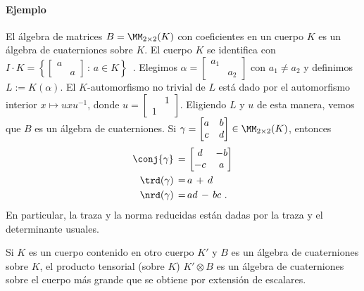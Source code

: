 \paragraph{Ejemplo}
El \'{a}lgebra de matrices $B=\MM_{2\times 2}(K)$ con coeficientes en un
cuerpo $K$ es un \'{a}lgebra de cuaterniones sobre $K$. El cuerpo $K$ se
identifica con
\begin{math}
 I\cdot K=\left\lbrace \begin{bmatrix} a & \\ & a \end{bmatrix}\,:\,
 a\in K\right\rbrace
\end{math}~.
Elegimos $\alpha=\begin{bmatrix} a_{1} & \\ & a_{2} \end{bmatrix}$ con
$a_{1}\not = a_{2}$ y definimos $L:=K(\alpha)$. El $K$-automorfismo no trivial
de $L$ est\'{a} dado por el automorfismo interior $x\mapsto uxu^{-1}$,
donde $u=\begin{bmatrix} & 1 \\ 1 & \end{bmatrix}$. Eligiendo $L$ y $u$
de esta manera, vemos que $B$ es un \'{a}lgebra de cuaterniones. Si
$\gamma=\begin{bmatrix} a & b \\ c & d \end{bmatrix}\in\MM_{2\times 2}(K)$,
entonces
\begin{align*}
 \conj{\gamma} \,=\, & \begin{bmatrix} d & -b \\ -c & a \end{bmatrix} \\
 \trd(\gamma) \,=\, & a\,+\,d \\
 \nrd(\gamma) \,=\, & ad\,-\,bc\text{ .}
\end{align*}
%
En particular, la traza y la norma reducidas est\'{a}n dadas por la traza
y el determinante usuales.


Si $K$ es un cuerpo contenido en otro cuerpo $K'$ y $B$ es un \'{a}lgebra
de cuaterniones sobre $K$, el producto tensorial (sobre $K$)
$K'\otimes B$ es un \'{a}lgebra de cuaterniones sobre el cuerpo m\'{a}s
grande que se obtiene por extensi\'{o}n de escalares.

